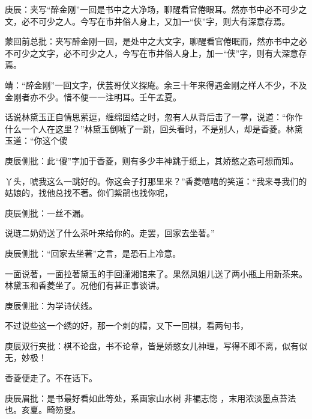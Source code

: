 \begin{parag}
    \begin{note}庚辰：夹写“醉金刚”一回是书中之大净场，聊醒看官倦眼耳。然亦书中必不可少之文，必不可少之人。今写在市井俗人身上，又加一“侠”字，则大有深意存焉。\end{note}
\end{parag}


\begin{parag}
    \begin{note}蒙回前总批：夹写醉金刚一回，是处中之大文字，聊醒看官倦眠而，然亦书中之必不可少之文字，必不可少之人，今写在市井俗人身上，加一“侠”字，则有大深意存焉。\end{note}
\end{parag}


\begin{parag}
    \begin{note}靖：“醉金刚”一回文字，伏芸哥仗义探庵。余三十年来得遇金刚之样人不少，不及金刚者亦不少。惜不便一一注明耳。壬午孟夏。\end{note}
\end{parag}


\begin{parag}
    话说林黛玉正自情思萦逗，缠绵固结之时，忽有人从背后击了一掌，说道：“你作什么一个人在这里？”林黛玉倒唬了一跳，回头看时，不是别人，却是香菱。林黛玉道：“你这个傻\begin{note}庚辰侧批：此“傻”字加于香菱，则有多少丰神跳于纸上，其娇憨之态可想而知。\end{note}丫头，唬我这么一跳好的。你这会子打那里来？”香菱嘻嘻的笑道：“我来寻我们的姑娘的，找他总找不著。你们紫鹃也找你呢，\begin{note}庚辰侧批：一丝不漏。\end{note}说琏二奶奶送了什么茶叶来给你的。走罢，回家去坐著。”\begin{note}庚辰侧批：“回家去坐著”之言，是恐石上冷意。\end{note}一面说著，一面拉著黛玉的手回潇湘馆来了。果然凤姐儿送了两小瓶上用新茶来。林黛玉和香菱坐了。况他们有甚正事谈讲。\begin{note}庚辰侧批：为学诗伏线。\end{note}不过说些这一个绣的好，那一个刺的精，又下一回棋，看两句书，\begin{note}庚辰双行夹批：棋不论盘，书不论章，皆是娇憨女儿神理，写得不即不离，似有似无，妙极！\end{note}香菱便走了。不在话下。\begin{note}庚辰眉批：是书最好看如此等处，系画家山水树 非褊志惚 ，末用浓淡墨点苔法也。亥夏。畸笏叟。\end{note}
\end{parag}


